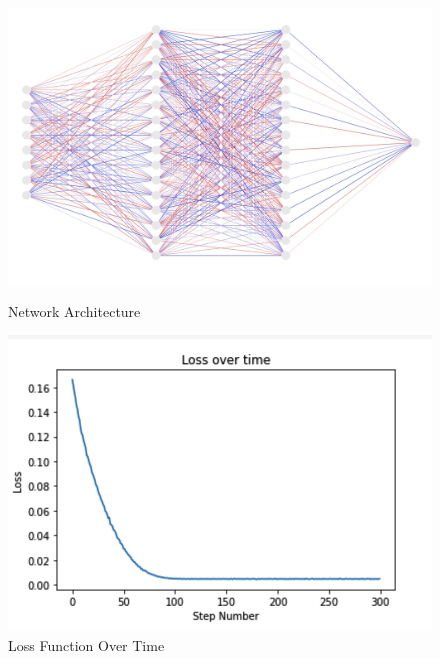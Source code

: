 \documentclass{article}
\begin{document}
\begin{figure}[!htb]
\begin{minipage}[b]{0.49\linewidth}
\centering
\includegraphics[width=\textwidth]{arch.jpg}
\caption{Network Architecture}
\end{minipage}
\begin{minipage}[b]{0.49\linewidth}
\centering
\includegraphics[width=\textwidth, trim={0 0 0 0.5cm},clip]{loss_over_time.png}
\caption{Loss Function Over Time}
\end{minipage}
\end{figure}
\end{document}

